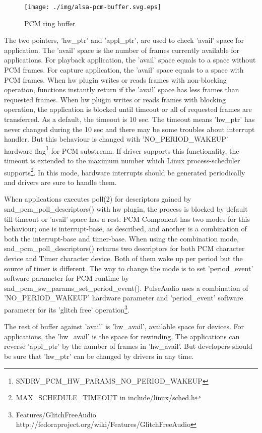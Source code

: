 \documentclass[onecolumn]{article}
\begin{document}
\begin{figure}[H]
	\centering
	\texttt{[image: ./img/alsa-pcm-buffer.svg.eps]}
	\caption{{PCM ring buffer}}
	\label{alsa-pcm-buffer}
\end{figure}

The two pointers, 'hw\_ptr' and 'appl\_ptr', are used to check 'avail' space for application. The 'avail' space is the number of frames currently available for applications. For playback application, the 'avail' space equals to a space without PCM frames. For capture application, the 'avail' space equals to a space with PCM frames. When hw plugin writes or reads frames with non-blocking operation, functions instantly return if the 'avail' space has less frames than requested frames. When hw plugin writes or reads frames with blocking operation, the application is blocked until timeout or all of requested frames are transferred. As a default, the timeout is 10 sec. The timeout means 'hw\_ptr' has never changed during the 10 sec and there may be some troubles about interrupt handler. But this behaviour is changed with 'NO\_PERIOD\_WAKEUP' hardware flag\footnote{SNDRV\_PCM\_HW\_PARAMS\_NO\_PERIOD\_WAKEUP} for PCM substream. If driver supports this functionality, the timeout is extended to the maximum number which Linux process-scheduler supports\footnote{MAX\_SCHEDULE\_TIMEOUT in include/linux/sched.h}. In this mode, hardware interrupts should be generated periodically and drivers are sure to handle them.

When applications executes poll(2) for descriptors gained by snd\_pcm\_poll\_descriptors() with hw plugin, the process is blocked by default till timeout or 'avail' space has a rest. PCM Component has two modes for this behaviour; one is interrupt-base, as described, and another is a combination of both the interrupt-base and timer-base. When using the combination mode, snd\_pcm\_poll\_descriptors() returns two descriptors for both PCM character device and Timer character device. Both of them wake up per period but the source of timer is different. The way to change the mode is to set 'period\_event' software parameter for PCM runtime by snd\_pcm\_sw\_params\_set\_period\_event(). PulseAudio uses a combination of 'NO\_PERIOD\_WAKEUP' hardware parameter and 'period\_event' software parameter for its 'glitch free' operation\footnote{Features/GlitchFreeAudio http://fedoraproject.org/wiki/Features/GlitchFreeAudio}.

The rest of buffer against 'avail' is 'hw\_avail', available space for devices. For applications, the 'hw\_avail' is the space for rewinding. The applications can reverse 'appl\_ptr' by the number of frames in 'hw\_avail'. But developers should be sure that 'hw\_ptr' can be changed by drivers in any time.
\end{document}
